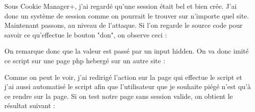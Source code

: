 \documentclass{article}
\begin{document}
Sous Cookie Manager+, j'ai regardé qu'une session était bel et bien crée. J'ai donc un système de session comme on pourrait le trouver sur n'importe quel site. Maintenant passons, au niveau de l'attaque. Si l'on regarde le source code pour savoir ce qu'effectue le bouton "don", on observe ceci :
\vspace{0.2cm}\\
\vspace{0.2cm}

On remarque donc que la valeur est passé par un input hidden. On va donc imité ce script sur une page php hebergé sur un autre site :
\vspace{0.2cm}\\
\vspace{0.2cm}

Comme on peut le voir, j'ai redirigé l'action sur la page qui effectue le script et j'ai aussi automatisé le script afin que l'utilisateur que je souhaite piégé n'est qu'à ce rendre sur la page. Si on test notre page sans session valide, on obtient le résultat suivant :
\vspace{0.2cm}\\
\vspace{0.2cm}
\end{document}
